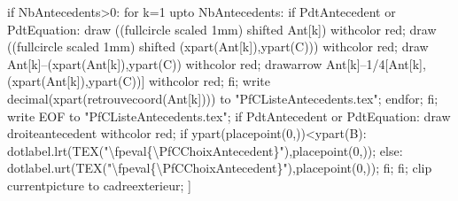 {{\begin{center}
{      if NbAntecedents>0:
      for k=1 upto NbAntecedents:
      if PdtAntecedent or PdtEquation:
      draw ((fullcircle scaled 1mm) shifted Ant[k]) withcolor red;
      draw ((fullcircle scaled 1mm) shifted (xpart(Ant[k]),ypart(C))) withcolor red;
      draw Ant[k]--(xpart(Ant[k]),ypart(C)) withcolor red;
      drawarrow Ant[k]--1/4[Ant[k],(xpart(Ant[k]),ypart(C))] withcolor red;
      fi;
      write decimal(xpart(retrouvecoord(Ant[k]))) to "PfCListeAntecedents.tex";
      endfor;
      fi;
      write EOF to "PfCListeAntecedents.tex";
      if PdtAntecedent or PdtEquation:
      draw droiteantecedent withcolor red;
      if ypart(placepoint(0,\PfCChoixAntecedent))<ypart(B):
      dotlabel.lrt(TEX("\num{\fpeval{\PfCChoixAntecedent}}"),placepoint(0,\PfCChoixAntecedent));
      else:
      dotlabel.urt(TEX("\num{\fpeval{\PfCChoixAntecedent}}"),placepoint(0,\PfCChoixAntecedent));
      fi;
      fi;
      clip currentpicture to cadreexterieur;
    }]{%
      \FooPoints
    }
  \end{center}
}
}%

